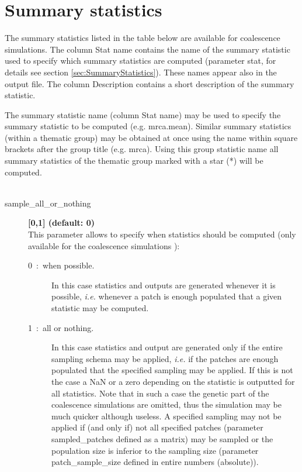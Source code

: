 \documentclass[letterpaper,12pt,oneside]{book}
\begin{document}
\begin{description}
\end{description}

\section{Summary statistics}\label{sec:SummaryStatistics_coalescence}
The summary statistics listed in the table below are available for coalescence simulations. The column \textsf{Stat name} contains the name of the summary statistic used to specify which summary statistics are computed (parameter \textsf{stat}, for details see section \ref{sec:SummaryStatistics}). These names appear also in the output file. The column \textsf{Description} contains a short description of the summary statistic. 

The summary statistic name (column \textsf{Stat name}) may be used to specify the summary statistic to be computed (e.g. \textsf{mrca.mean}). Similar summary statistics (within a thematic group) may be obtained at once using the name within square brackets after the group title (e.g. \textsf{mrca}). Using this group statistic name all summary statistics of the thematic group marked with a star (*) will be computed. 
\\
\\
\begin{description}
\item[sample\_all\_or\_nothing] \textbf{[0,1] (default: 0)}\\
This parameter allows to specify when statistics should be computed (only available for the coalescence simulations ):
\begin{description}
\item[0~:~when possible.] In this case statistics and outputs are generated whenever it is possible, \textit{i.e.} whenever a patch is enough populated that a given statistic may be computed.
\item[1~:~all or nothing.] In this case statistics and output are generated only if the entire sampling schema may be applied, \textit{i.e.} if the patches are enough populated that the specified sampling may be applied. If this is not the case a NaN or a zero depending on the statistic is outputted for all statistics. Note that in such a case the genetic part of the coalescence simulations are omitted, thus the simulation may be much quicker although useless. A specified sampling may not be applied if (and only if) not all specified patches (parameter \textsf{sampled\_patches} defined as a matrix) may be sampled or the population size is inferior to the sampling size (parameter \textsf{patch\_sample\_size} defined in entire numbers (absolute)).
\end{description}
\end{description}
\end{document}

